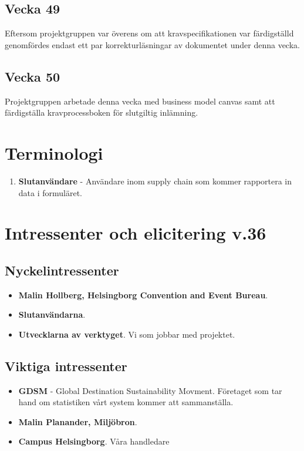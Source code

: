 \documentclass[12pt]{article}
\begin{document}
 \subsection{Vecka 49}
 Eftersom projektgruppen var överens om att kravspecifikationen var färdigställd genomfördes endast ett par korrekturläsningar av dokumentet under denna vecka.
 
 \subsection{Vecka 50}
 Projektgruppen arbetade denna vecka med business model canvas samt att färdigställa kravprocessboken för slutgiltig inlämning.
 
 

  
    \newpage
    
\section{Terminologi}
    \begin{enumerate}
        \item \textbf{Slutanvändare} - Användare inom supply chain som kommer rapportera in data i formuläret.
        
    \end{enumerate}
    

\section{Intressenter och elicitering v.36}

    \subsection{Nyckelintressenter}
        \begin{itemize}
            \item \textbf{Malin Hollberg, Helsingborg Convention and Event Bureau}.
                \\
            \item \textbf{Slutanvändarna}.
                \\
             \item \textbf{Utvecklarna av verktyget}. Vi som jobbar med projektet.
                \\
        \end{itemize}
        
    \subsection{Viktiga intressenter}
        \begin{itemize}
            \item \textbf{GDSM} - Global Destination Sustainability Movment. Företaget som tar hand om statistiken vårt system kommer att sammanställa.
             \\
            \item \textbf{Malin Planander, Miljöbron}.
            \\
            \item \textbf{Campus Helsingborg}. Våra handledare
        \end{itemize}
        
\end{document}
